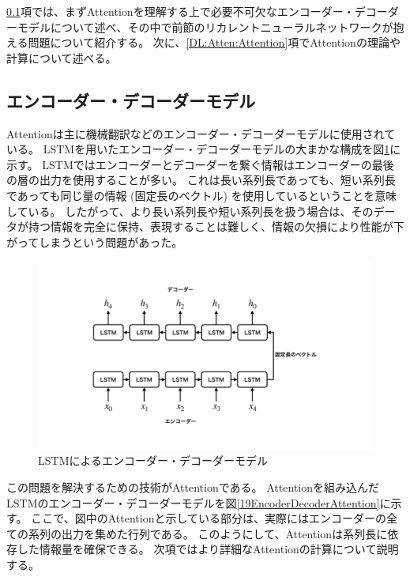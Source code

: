 \ref{DL:Atten:EncoderDecoderModel}項では、まずAttentionを理解する上で必要不可欠なエンコーダー・デコーダーモデルについて述べ、その中で前節のリカレントニューラルネットワークが抱える問題について紹介する。
次に、\ref{DL:Atten:Attention}項でAttentionの理論や計算について述べる。


\subsection{エンコーダー・デコーダーモデル} \label{DL:Atten:EncoderDecoderModel}

Attentionは主に機械翻訳などのエンコーダー・デコーダーモデルに使用されている。
LSTMを用いたエンコーダー・デコーダーモデルの大まかな構成を図\ref{18EncoderDecoderLSTM}に示す。
LSTMではエンコーダーとデコーダーを繋ぐ情報はエンコーダーの最後の層の出力を使用することが多い。
これは長い系列長であっても、短い系列長であっても同じ量の情報 (固定長のベクトル) を使用しているということを意味している。
したがって、より長い系列長や短い系列長を扱う場合は、そのデータが持つ情報を完全に保持、表現することは難しく、情報の欠損により性能が下がってしまうという問題があった。

\begin{figure}[h]
 \centering
 \includegraphics[trim = 100 100 100 100, width=1.0\textwidth, clip]{Figure/2DeepLearning/18EncoderDecoderLSTM.png}
 \caption{LSTMによるエンコーダー・デコーダーモデル}
 \label{18EncoderDecoderLSTM}
\end{figure}

この問題を解決するための技術がAttentionである。
Attentionを組み込んだLSTMのエンコーダー・デコーダーモデルを図\ref{19EncoderDecoderAttention}に示す。
ここで、図中のAttentionと示している部分は、実際にはエンコーダーの全ての系列の出力を集めた行列である。
このようにして、Attentionは系列長に依存した情報量を確保できる。
次項ではより詳細なAttentionの計算について説明する。

